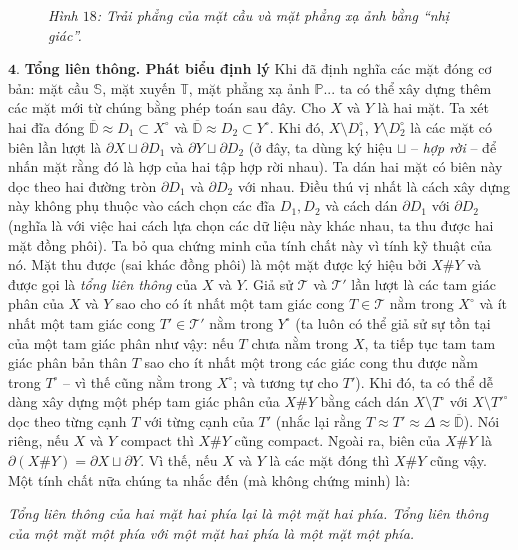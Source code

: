 \begin{multicols}{2}
\begin{figure}[H]
		\caption{\small\textit{\color{duongvaotoanhoc}Hình $18$: Trải phẳng của mặt cầu và mặt phẳng xạ ảnh bằng ``nhị giác''.}}
		\vspace*{-10pt}
	\end{figure}
	$\pmb{4.}$ \textbf{\color{duongvaotoanhoc}Tổng liên thông. Phát biểu định lý}
	\vskip 0.1cm
	Khi đã định nghĩa các mặt đóng cơ bản: mặt cầu $\mathbb{S}$, mặt xuyến $\mathbb{T}$, mặt phẳng xạ ảnh $\mathbb{P}$... ta có thể xây dựng thêm các mặt mới từ chúng bằng phép toán sau đây. 
	\vskip 0.1cm
	Cho $X$ và $Y$ là hai mặt. Ta xét hai đĩa đóng $\overline{\mathbb{D}} \approx D_1 \subset X^\circ$ và $\overline{\mathbb{D}} \approx D_2 \subset Y^\circ$. Khi đó, $X \setminus D_1^\circ$, $Y \setminus D_2^\circ$ là các mặt có biên lần lượt là $\partial X \sqcup \partial D_1$ và $\partial Y \sqcup \partial D_2$ (ở đây, ta dùng ký hiệu $\sqcup$ -- {\it hợp rời} -- để nhấn mặt rằng đó là hợp của hai tập hợp rời nhau). Ta dán hai mặt có biên này dọc theo hai đường tròn $\partial D_1$ và $\partial D_2$ với nhau. Điều thú vị nhất là cách xây dựng này không phụ thuộc vào cách chọn các đĩa $D_1,D_2$ và cách dán $\partial D_1$ với $\partial D_2$ (nghĩa là với việc hai cách lựa chọn các dữ liệu này khác nhau, ta thu được hai mặt đồng phôi). Ta bỏ qua chứng minh của tính chất này vì tính kỹ thuật của nó. Mặt thu được (sai khác đồng phôi) là một mặt được ký hiệu bởi $X \# Y$ và được gọi là {\it tổng liên thông} của $X$ và $Y$.
	\vskip 0.1cm
	Giả sử $\mathscr{T}$ và $\mathscr{T}'$ lần lượt là các tam giác phân của $X$ và $Y$ sao cho có ít nhất một tam giác cong $T \in \mathscr{T}$ nằm trong $X^\circ$ và ít nhất một tam giác cong $T' \in \mathscr{T}'$ nằm trong $Y^\circ$ (ta luôn có thể giả sử sự tồn tại của một tam giác phân như vậy: nếu $T$ chưa nằm trong $X$, ta tiếp tục tam tam giác phân bản thân $T$ sao cho ít nhất một trong các giác cong thu được nằm trong $T^\circ$ -- vì thế cũng nằm trong $X^\circ$; và tương tự cho $T'$). Khi đó, ta có thể dễ dàng xây dựng một phép tam giác phân của $X \# Y$ bằng cách dán $X \setminus T^\circ$ với $X \setminus T'^\circ$ dọc theo từng cạnh $T$ với từng cạnh của $T'$ (nhắc lại rằng $T \approx T' \approx \Delta \approx \overline{\mathbb{D}}$). Nói riêng, nếu $X$ và $Y$ compact thì $X \# Y$ cũng compact. Ngoài ra, biên của $X \# Y$ là $\partial(X \# Y) = \partial X \sqcup \partial Y$. Vì thế, nếu $X$ và $Y$ là các mặt đóng thì $X \# Y$ cũng vậy.  
	\vskip 0.1cm
	Một tính chất nữa chúng ta nhắc đến (mà không chứng minh) là:
	\begin{center}
		{\it Tổng liên thông của hai mặt hai phía lại là một mặt hai phía. Tổng liên thông của một mặt một phía với một mặt hai phía là một mặt một phía.}

\end{center}
\end{multicols}
